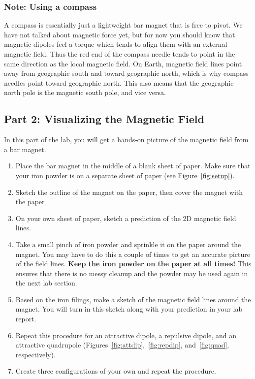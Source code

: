 \documentclass[12pt]{article}
\begin{document}
	\subsubsection*{Note: Using a compass}
	A compass is essentially just a lightweight bar magnet that is free to pivot. We have not talked about magnetic force yet, but for now you should know that magnetic dipoles feel a torque which tends to align them with an external magnetic field. Thus the red end of the compass needle tends to point in the same direction as the local magnetic field. On Earth, magnetic field lines point away from geographic south and toward geographic north, which is why compass needles point toward geographic north. This also means that the geographic north pole is the magnetic south pole, and vice versa.
	
	\subsection*{Part 2: Visualizing the Magnetic Field}
	In this part of the lab, you will get a hands-on picture of the magnetic field from a bar magnet.
	\begin{enumerate}
		\item{Place the bar magnet in the middle of a blank sheet of paper. Make sure that your iron powder is on a separate sheet of paper (see Figure~\ref{fig:setup}).}
		\item{Sketch the outline of the magnet on the paper, then cover the magnet with the paper}
		\item{On your own sheet of paper, sketch a prediction of the 2D magnetic field lines.}
		\item{Take a small pinch of iron powder and sprinkle it on the paper around the magnet. You may have to do this a couple of times to get an accurate picture of the field lines. \textbf{Keep the iron powder on the paper at all times!} This ensures that there is no messy cleanup and the powder may be used again in the next lab section.} 
		\item{Based on the iron filings, make a sketch of the magnetic field lines around the magnet. You will turn in this sketch along with your prediction in your lab report.}
		\item{Repeat this procedure for an attractive dipole, a repulsive dipole, and an attractive quadrupole (Figures~\ref{fig:attdip},~\ref{fig:repdip}, and~\ref{fig:quad}, respectively).}
		\item{Create three configurations of your own and repeat the procedure.}
		
	\end{enumerate}
	
\end{document}
